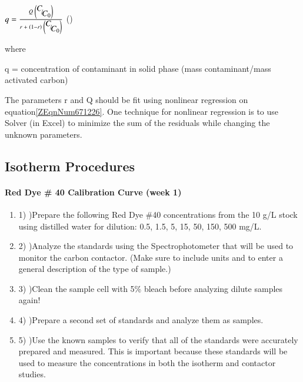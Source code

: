 \documentclass{article} %
\begin{document}
 $q=\frac{Q\; \left({\raise0.7ex\hbox{$ C $}\!\mathord{\left/ {\vphantom {C C_{0} }} \right. \kern-\nulldelimiterspace}\!\lower0.7ex\hbox{$ C_{0}  $}} \right)}{r\; +\; \left(1-r\right)\; \left({\raise0.7ex\hbox{$ C $}\!\mathord{\left/ {\vphantom {C C_{0} }} \right. \kern-\nulldelimiterspace}\!\lower0.7ex\hbox{$ C_{0}  $}} \right)} $ (\label{ZEqnNum671226})

\noindent where 

\noindent q =  concentration of contaminant in solid phase (mass contaminant/mass activated carbon)

The parameters r and Q should be fit using nonlinear regression on equation\eqref{ZEqnNum671226}. One technique for nonlinear regression is to use Solver (in Excel) to minimize the sum of the residuals while changing the unknown parameters.

\noindent 
\subsection{ }



\noindent 
\subsection{Isotherm Procedures}

\noindent 
\paragraph{Red Dye \# 40 Calibration Curve (week 1)}

\noindent \begin{enumerate}
\item 1) )Prepare the following Red Dye \#40 concentrations from the 10 g/L stock using distilled water for dilution: 0.5, 1.5, 5, 15, 50, 150, 500 mg/L.

\noindent \item 2) )Analyze the standards using the Spectrophotometer that will be used to monitor the carbon contactor. (Make sure to include units and to enter a general description of the type of sample.) 

\noindent \item 3) )Clean the sample cell with 5\% bleach before analyzing dilute samples again!

\noindent \item 4) )Prepare a second set of standards and analyze them as samples.

\noindent \item 5) )Use the known samples to verify that all of the standards were accurately prepared and measured. This is important because these standards will be used to measure the concentrations in both the isotherm and contactor studies.
\end{enumerate}
\end{document}

